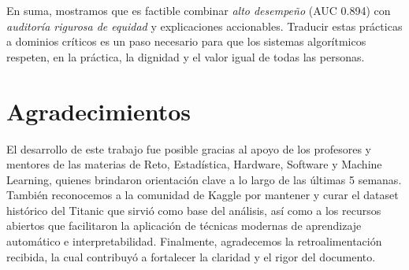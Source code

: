 \documentclass[conference]{IEEEtran}
\begin{document}
\medskip
En suma, mostramos que es factible combinar \emph{alto desempeño} (AUC 0.894) con \emph{auditoría rigurosa de equidad} y explicaciones accionables. Traducir estas prácticas a dominios críticos es un paso necesario para que los sistemas algorítmicos respeten, en la práctica, la dignidad y el valor igual de todas las personas.


\section*{Agradecimientos}

El desarrollo de este trabajo fue posible gracias al apoyo de los profesores y mentores de las materias de Reto, Estadística, Hardware, Software y Machine Learning, quienes brindaron orientación clave a lo largo de las últimas 5 semanas. También reconocemos a la comunidad de Kaggle por mantener y curar el dataset histórico del Titanic que sirvió como base del análisis, así como a los recursos abiertos que facilitaron la aplicación de técnicas modernas de aprendizaje automático e interpretabilidad. Finalmente, agradecemos la retroalimentación recibida, la cual contribuyó a fortalecer la claridad y el rigor del documento.
\end{document}
